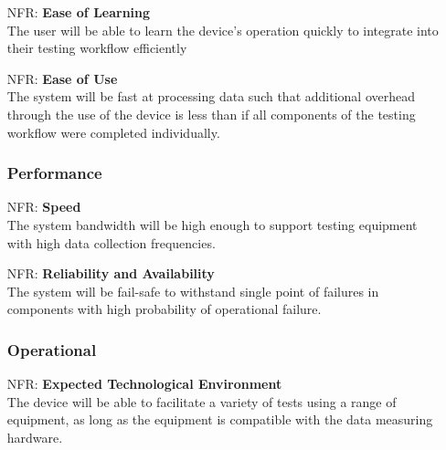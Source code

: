 \documentclass[12pt]{article}
\newcounter{nfrnum} %
\begin{document}
\noindent\begin{itemize}

\subsubsection{Usability} 

    \item[NFR\refstepcounter{nfrnum}\thenfrnum:]
    \textbf{Ease of Learning}\\
    The user will be able to learn the device's operation quickly to integrate into their testing workflow efficiently\\

    \item[NFR\refstepcounter{nfrnum}\thenfrnum:]
    \textbf{Ease of Use}\\
    The system will be fast at processing data such that additional overhead through the use of the device is less than if all components of the testing workflow were completed individually.\\

\subsubsection{Performance} 

    \item[NFR\refstepcounter{nfrnum}\thenfrnum:]
    \textbf{Speed}\\
    The system bandwidth will be high enough to support testing equipment with high data collection frequencies.\\

    \item[NFR\refstepcounter{nfrnum}\thenfrnum:]
    \textbf{Reliability and Availability}\\
    The system will be fail-safe to withstand single point of failures in components with high probability of operational failure.\\

\subsubsection{Operational}

    \item[NFR\refstepcounter{nfrnum}\thenfrnum:]
      \textbf{Expected Technological Environment}\\
    The device will be able to facilitate a variety of tests using a range of equipment, as long as the equipment is compatible with the data measuring hardware.\\


\end{itemize}
\end{document}
